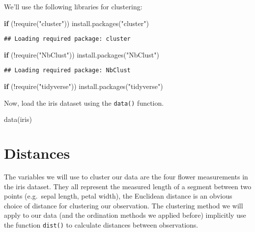 \documentclass[
]{book}
\newenvironment{Shaded}{\begin{snugshade}}{\end{snugshade}}
\newcommand{\ControlFlowTok}[1]{\textcolor[rgb]{0.13,0.29,0.53}{\textbf{#1}}}
\newcommand{\FunctionTok}[1]{\textcolor[rgb]{0.00,0.00,0.00}{#1}}
\newcommand{\NormalTok}[1]{#1}
\newcommand{\SpecialCharTok}[1]{\textcolor[rgb]{0.00,0.00,0.00}{#1}}
\newcommand{\StringTok}[1]{\textcolor[rgb]{0.31,0.60,0.02}{#1}}
\begin{document}
We'll use the following libraries for clustering:

\begin{Shaded}
\begin{Highlighting}[]
\ControlFlowTok{if}\NormalTok{ (}\SpecialCharTok{!}\FunctionTok{require}\NormalTok{(}\StringTok{"cluster"}\NormalTok{)) }\FunctionTok{install.packages}\NormalTok{(}\StringTok{"cluster"}\NormalTok{)}
\end{Highlighting}
\end{Shaded}

\begin{verbatim}
## Loading required package: cluster
\end{verbatim}

\begin{Shaded}
\begin{Highlighting}[]
\ControlFlowTok{if}\NormalTok{ (}\SpecialCharTok{!}\FunctionTok{require}\NormalTok{(}\StringTok{"NbClust"}\NormalTok{)) }\FunctionTok{install.packages}\NormalTok{(}\StringTok{"NbClust"}\NormalTok{)}
\end{Highlighting}
\end{Shaded}

\begin{verbatim}
## Loading required package: NbClust
\end{verbatim}

\begin{Shaded}
\begin{Highlighting}[]
\ControlFlowTok{if}\NormalTok{ (}\SpecialCharTok{!}\FunctionTok{require}\NormalTok{(}\StringTok{"tidyverse"}\NormalTok{)) }\FunctionTok{install.packages}\NormalTok{(}\StringTok{"tidyverse"}\NormalTok{)}
\end{Highlighting}
\end{Shaded}

Now, load the iris dataset using the \texttt{data()} function.

\begin{Shaded}
\begin{Highlighting}[]
\FunctionTok{data}\NormalTok{(iris)}
\end{Highlighting}
\end{Shaded}

\hypertarget{distances}{%
\section{Distances}\label{distances}}

The variables we will use to cluster our data are the four flower measurements in the iris dataset. They all represent the measured length of a segment between two points (e.g.~sepal length, petal width), the Euclidean distance is an obvious choice of distance for clustering our observation. The clustering method we will apply to our data (and the ordination methods we applied before) implicitly use the function \texttt{dist()} to calculate distances between observations.
\end{document}

